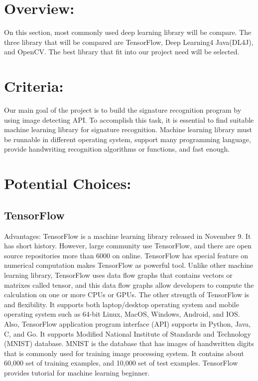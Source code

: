 \documentclass[onecolumn, draftclsnofoot,10pt, compsoc]{IEEEtran}
\begin{document}
\section{Overview:}
On this section, most commonly used deep learning library will be compare. The three library that will be compared are TensorFlow, Deep Learning4 Java(DL4J), and OpenCV. The best library that fit into our project need will be selected.

\section{Criteria:}
Our main goal of the project is to build the signature recognition program by using image detecting API. To accomplish this task, it is essential to find suitable machine learning library for signature recognition.  Machine learning library must be runnable in different operating system, support many programming language, provide handwriting recognition algorithms or functions, and fast enough. 

\section{Potential Choices:}
\subsection{TensorFlow}
 Advantages: TensorFlow is a machine learning library released in November 9. It has short history. However, large community use TensorFlow, and there are open source repositories more than 6000 on online. TensorFlow has special feature on numerical computation makes TensorFlow as powerful tool. Unlike other machine learning library, TensorFlow uses data flow graphs that contains vectors or matrixes called tensor, and this data flow graphs allow developers to compute the calculation on one or more CPUs or GPUs.
The other strength of TensorFlow is and flexibility. It supports both laptop/desktop operating system and mobile operating system such as 64-bit Linux, MacOS, Windows, Android, and IOS. Also, TensorFlow application program interface (API) supports in Python, Java, C, and Go.
It supports Modified National Institute of Standards and Technology (MNIST) database. MNIST is the database that has images of handwritten digits that is commonly used for training image processing system. It contains about 60,000 set of training examples, and 10,000 set of test examples. TensorFlow provides tutorial for machine learning beginner.
\end{document}
